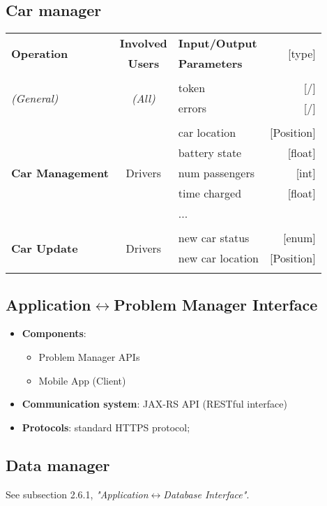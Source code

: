 \subsection{Car manager}
	\begin{center}
		\begin{tabular}{ l | c | l   r }
			\multirow{2}{*}{\textbf{Operation}} & \textbf{Involved} & \textbf{Input/Output} & \multirow{2}{*}{[type]}\\
			& \textbf{Users} & \textbf{Parameters} & \\ [1.5ex]
			\hline\hline\\
			
			\multirow{2}{*}{\textit{(General)}}
				& \multirow{2}{*}{\textit{(All)}}
					&	token & [/]\\
					&&	errors & [/]\\ [1.5ex]
			\hline\\
			
			\multirow{5}{*}{\textbf{Car Management}}
				& \multirow{5}{*}{Drivers}
					&	car location & [Position]\\
					&&	battery state & [float]\\
					&&	num passengers & [int]\\
					&&	time charged & [float]\\
					&&	... & \\ [1.5ex]
			\hline\\
			
			\multirow{2}{*}{\textbf{Car Update}}
				& \multirow{2}{*}{Drivers}
					&	new car status & [enum]\\
					&&	new car location & [Position]\\ [1.5ex]
			\hline\\

		\end{tabular}
	\end{center}
	
\subsection{Application$\leftrightarrow$Problem Manager Interface}
	\begin{itemize}
		\item [] \textbf{Components}:
			\begin{itemize}
				\item Problem Manager APIs
				\item Mobile App (Client)
			\end{itemize}			
		\item [] \textbf{Communication system}: JAX-RS API (RESTful interface)
		\item [] \textbf{Protocols}: standard HTTPS protocol;
	\end{itemize}

\subsection{Data manager}
	See subsection 2.6.1, \textit{"Application$\leftrightarrow$Database Interface"}.